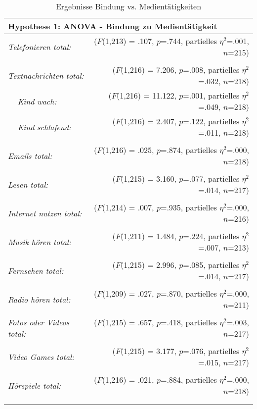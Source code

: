 \begin{table}[ht]
\begin{tabular}{l l  r }

  \multicolumn{3}{l}{\textbf{Hypothese 1:} ANOVA - Bindung zu Medientätigkeit}\\
  \hline
  \multicolumn{2}{l}{\textit{Telefonieren total:}} & ($F$(1,213) = .107, $p$=.744, partielles $\eta^2$=.001, $n$=215)\\
  &&\\
  \multicolumn{2}{l}{\textit{Textnachrichten total:}} & ($F$(1,216) = 7.206, $p$=.008, partielles $\eta^2$=.032, $n$=218)\\
  & \textit{Kind wach:} & ($F$(1,216) = 11.122, $p$=.001, partielles $\eta^2$=.049, $n$=218)\\
  & \textit{Kind schlafend:} & ($F$(1,216) = 2.407, $p$=.122, partielles $\eta^2$=.011, $n$=218)\\
  &&\\
  \multicolumn{2}{l}{\textit{Emails total:}} & ($F$(1,216) = .025, $p$=.874, partielles $\eta^2$=.000, $n$=218)\\
  &&\\
  \multicolumn{2}{l}{\textit{Lesen total:}} & ($F$(1,215) = 3.160, $p$=.077, partielles $\eta^2$=.014, $n$=217)\\
  &&\\
  \multicolumn{2}{l}{\textit{Internet nutzen total:}} & ($F$(1,214) = .007, $p$=.935, partielles $\eta^2$=.000, $n$=216)\\
  &&\\
  \multicolumn{2}{l}{\textit{Musik hören total:}} & ($F$(1,211) = 1.484, $p$=.224, partielles $\eta^2$=.007, $n$=213)\\
  &&\\
  \multicolumn{2}{l}{\textit{Fernsehen total: }} & ($F$(1,215) = 2.996, $p$=.085, partielles $\eta^2$=.014, $n$=217)\\
  &&\\
  \multicolumn{2}{l}{\textit{Radio hören total:}} & ($F$(1,209) = .027, $p$=.870, partielles $\eta^2$=.000, $n$=211)\\
  &&\\
  \multicolumn{2}{l}{\textit{Fotos oder Videos total: }} & ($F$(1,215) = .657, $p$=.418, partielles $\eta^2$=.003, $n$=217)\\
  &&\\
  \multicolumn{2}{l}{\textit{Video Games total:}} & ($F$(1,215) = 3.177, $p$=.076, partielles $\eta^2$=.015, $n$=217)\\
  &&\\
  \multicolumn{2}{l}{\textit{Hörspiele total:}} & ($F$(1,216) = .021, $p$=.884, partielles $\eta^2$=.000, $n$=218)\\
  &&\\
  
  &&\\
\end{tabular}
\caption{Ergebnisse Bindung vs. Medientätigkeiten}
\label{table:AppResultateMedientaetigkeiten}
\end{table}